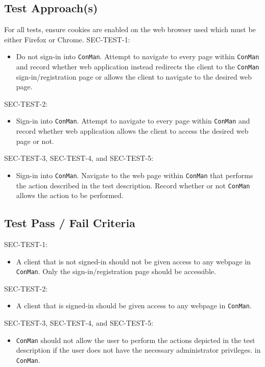 \documentclass{article}
\begin{document}
\subsection{Test Approach(s)}
For all tests, ensure cookies are enabled on the web browser used which must be 
either Firefox or Chrome.\newline \newline
SEC-TEST-1:
\begin{itemize}
\item Do not sign-in into \texttt{ConMan}. Attempt to navigate to every page within 
\texttt{ConMan} and record whether web application instead redirects the client 
to the \texttt{ConMan} sign-in/registration page or allows the client to navigate 
to the desired web page.
\end{itemize}
SEC-TEST-2:
\begin{itemize}
\item Sign-in into \texttt{ConMan}. Attempt to navigate to every page within 
\texttt{ConMan} and record whether web application allows the client to access the 
desired web page or not.
\end{itemize}
SEC-TEST-3, SEC-TEST-4, and SEC-TEST-5:
\begin{itemize}
\item Sign-in into \texttt{ConMan}. Navigate to the web page within \texttt{ConMan} 
that performs the action described in the test description. Record whether or not 
\texttt{ConMan} allows the action to be performed.
\end{itemize}

\subsection{Test Pass / Fail Criteria}
SEC-TEST-1:
\begin{itemize}
\item A client that is not signed-in should not be given access to any webpage 
in \texttt{ConMan}. Only the sign-in/registration page should be accessible.
\end{itemize}

SEC-TEST-2:
\begin{itemize}
\item A client that is signed-in should be given access to any webpage 
in \texttt{ConMan}.
\end{itemize}

SEC-TEST-3, SEC-TEST-4, and SEC-TEST-5:
\begin{itemize}
\item \texttt{ConMan} should not allow the user to perform the actions depicted in 
the test description if the user does not have the necessary administrator privileges. 
in \texttt{ConMan}.
\end{itemize}
\end{document}
